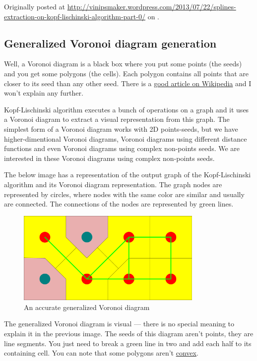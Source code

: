 Originally posted at
\url{http://vinipsmaker.wordpress.com/2013/07/22/splines-extraction-on-kopf-lischinski-algorithm-part-0/}
on .

\subsection{Generalized Voronoi diagram generation}

Well, a Voronoi diagram is a black box where you put some points (the seeds) and
you get some polygons (the cells). Each polygon contains all points that are
closer to its seed than any other seed. There is a
\href{http://en.wikipedia.org/wiki/Voronoi_diagram}{good article on Wikipedia}
and I won't explain any further.

Kopf-Lischinski algorithm executes a bunch of operations on a graph and it uses
a Voronoi diagram to extract a visual representation from this graph. The
simplest form of a Voronoi diagram works with 2D points-seeds, but we have
higher-dimentional Voronoi diagrams, Voronoi diagrams using different distance
functions and even Voronoi diagrams using complex non-points seeds. We are
interested in these Voronoi diagrams using complex non-points seeds.

The below image has a representation of the output graph of the Kopf-Lischinski
algorithm and its Voronoi diagram representation. The graph nodes are
represented by circles, where nodes with the same color are similar and usually
are connected. The connections of the nodes are represented by green lines.

\begin{figure}[H]
  \centering
  \includegraphics[width=0.8\textwidth]{assets/accurate_voronoi.pdf}
  \caption{An accurate generalized Voronoi diagram}
\end{figure}

The generalized Voronoi diagram is visual --- there is no special meaning to
explain it in the previous image. The seeds of this diagram aren't points, they
are line segments. You just need to break a green line in two and add each half
to its containing cell. You can note that some polygons aren't
\href{http://en.wikipedia.org/wiki/Convex_polygon}{convex}.

